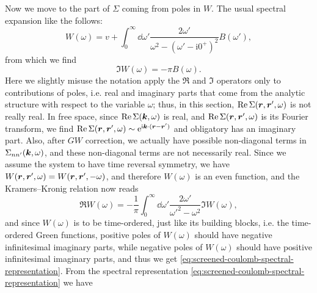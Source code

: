 \documentclass[hyperref, a4paper, 12pt]{report}
\newcommand*{\ii}{\mathrm{i}}
\newcommand*{\ee}{\mathrm{e}}
\begin{document}
Now we move to the part of $\Sigma$ coming from poles in $W$.
The usual spectral expansion like the follows: 
\begin{equation}
    W(\omega) = v + \int_{0}^{\infty} \dd{\omega'}
    \frac{2 \omega'}{\omega^2 - (\omega' - \ii 0^+)^2} B(\omega'),
    \label{eq:screened-coulomb-spectral-representation}
\end{equation}
from which we find 
\begin{equation}
    \Im W(\omega) = - \pi B(\omega).
    \label{eq:screened-coulomb-spectral-b}
\end{equation}
Here we slightly misuse the notation 
apply the $\Re$ and $\Im$ operators 
only to contributions of poles, 
i.e. real and imaginary parts that come from the analytic structure 
with respect to the variable $\omega$; 
thus, in this section, $\Re \Sigma(\vb*{r}, \vb*{r}', \omega)$ 
is not really real.
In free space, since $\Re \Sigma(\vb*{k}, \omega)$ is real, 
and $\Re \Sigma(\vb*{r}, \vb*{r}', \omega)$ is its Fourier transform,
we find $\Re \Sigma(\vb*{r}, \vb*{r}', \omega) \sim \ee^{\ii \vb*{k} \cdot (\vb*{r} - \vb*{r}')}$
and obligatory has an imaginary part. 
Also, after $GW$ correction, we actually have possible non-diagonal terms in  
$\Sigma_{n n'}(\vb*{k}, \omega)$, 
and these non-diagonal terms are not necessarily real. 
Since we assume the system to have time reversal symmetry, 
we have $W(\vb*{r}, \vb*{r}', \omega) = W(\vb*{r}, \vb*{r}', - \omega)$,
and therefore $W(\omega)$ is an even function, 
and the Kramers–Kronig relation now reads 
\[
    \Re W(\omega) = - \frac{1}{\pi} \int_{0}^{\infty} \dd{\omega'}
    \frac{2 \omega'}{\omega'^2 - \omega^2} \Im W(\omega),
\] 
and since $W(\omega)$ is to be time-ordered, 
just like its building blocks, i.e. the time-ordered Green functions, 
positive poles of $W(\omega)$ should have negative infinitesimal imaginary parts, 
while negative poles of $W(\omega)$ should have positive infinitesimal imaginary parts, 
and thus we get \eqref{eq:screened-coulomb-spectral-representation}.
From the spectral representation \eqref{eq:screened-coulomb-spectral-representation} we have 
\end{document}
